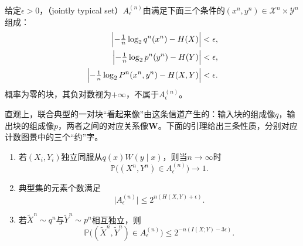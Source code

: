 \begin{definition}[联合典型集]
\label{def:dcc-joint-typical}
给定$\epsilon>0$，（jointly typical set）$A_{\epsilon}^{(n)}$由满足下面三个条件的$(x^n,y^n)\in\mathcal{X}^n\times\mathcal{Y}^n$组成：
\begin{equation}
 \begin{aligned}
 \Bigl\lvert-\tfrac1n\log_2q^n(x^n)-H(X)\Bigr\rvert&<\epsilon ,\\
 \Bigl\lvert-\tfrac1n\log_2p^n(y^n)-H(Y)\Bigr\rvert&<\epsilon ,\\
 \Bigl\lvert-\tfrac1n\log_2P^n(x^n,y^n)-H(X,Y)\Bigr\rvert&<\epsilon .
 \end{aligned}
 \label{eq:dcc-joint-typical}
\end{equation}
概率为零的块，其负对数视为$+\infty$，不属于$A_{\epsilon}^{(n)}$。
\end{definition}

直观上，联合典型的一对块“看起来像”由这条信道产生的：输入块的组成像$q$，输出块的组成像$p$，两者之间的对应关系像$\bm{W}$。下面的引理给出三条性质，分别对应计数图景中的三个“约”字。

\begin{lemma}[联合典型性]
\label{lem:dcc-joint-aep}
\begin{enumerate}
 \item 若$(X_i,Y_i)$独立同服从$q(x)W(y\mid x)$，则当$n\to\infty$时
 \begin{equation}
  \mathbb{P}\bigl((X^n,Y^n)\in A_{\epsilon}^{(n)}\bigr)\to1 .
  \label{eq:dcc-typical-prob}
 \end{equation}
 \item 典型集的元素个数满足
 \begin{equation}
  \bigl\lvert A_{\epsilon}^{(n)}\bigr\rvert\leq2^{n(H(X,Y)+\epsilon)} .
  \label{eq:dcc-typical-size}
 \end{equation}
 \item 若$\tilde{X}^n\sim q^n$与$\tilde{Y}^n\sim p^n$相互独立，则
 \begin{equation}
  \mathbb{P}\bigl((\tilde{X}^n,\tilde{Y}^n)\in A_{\epsilon}^{(n)}\bigr)\leq2^{-n(I(X;Y)-3\epsilon)} .
  \label{eq:dcc-independent-typical}
 \end{equation}
\end{enumerate}
\end{lemma}

